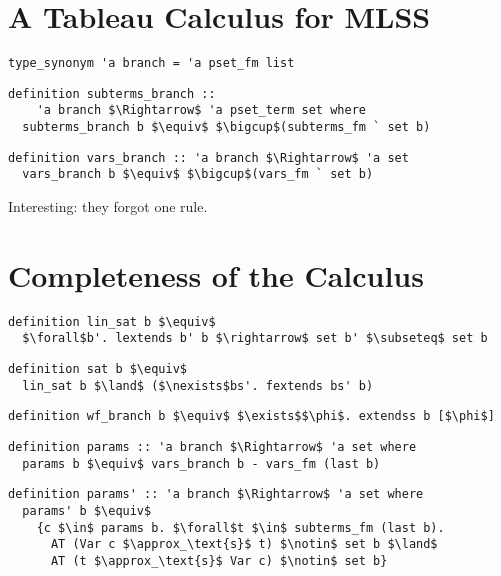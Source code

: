 \documentclass[sigplan,10pt,anonymous,review]{acmart}
\begin{document}
\section{A Tableau Calculus for MLSS}
\begin{lstlisting}
type_synonym 'a branch = 'a pset_fm list
\end{lstlisting}

\begin{lstlisting}
definition subterms_branch ::
    'a branch $\Rightarrow$ 'a pset_term set where
  subterms_branch b $\equiv$ $\bigcup$(subterms_fm ` set b)
\end{lstlisting}

\begin{lstlisting}
definition vars_branch :: 'a branch $\Rightarrow$ 'a set 
  vars_branch b $\equiv$ $\bigcup$(vars_fm ` set b)
\end{lstlisting}


Interesting: they forgot one rule.

\section{Completeness of the Calculus}
\begin{lstlisting}
definition lin_sat b $\equiv$
  $\forall$b'. lextends b' b $\rightarrow$ set b' $\subseteq$ set b
\end{lstlisting}

\begin{lstlisting}
definition sat b $\equiv$
  lin_sat b $\land$ ($\nexists$bs'. fextends bs' b)
\end{lstlisting}

\begin{lstlisting}
definition wf_branch b $\equiv$ $\exists$$\phi$. extendss b [$\phi$]
\end{lstlisting}

\begin{lstlisting}
definition params :: 'a branch $\Rightarrow$ 'a set where
  params b $\equiv$ vars_branch b - vars_fm (last b)
\end{lstlisting}

\begin{lstlisting}
definition params' :: 'a branch $\Rightarrow$ 'a set where
  params' b $\equiv$
    {c $\in$ params b. $\forall$t $\in$ subterms_fm (last b).
      AT (Var c $\approx_\text{s}$ t) $\notin$ set b $\land$
      AT (t $\approx_\text{s}$ Var c) $\notin$ set b} 
\end{lstlisting}
\end{document}
